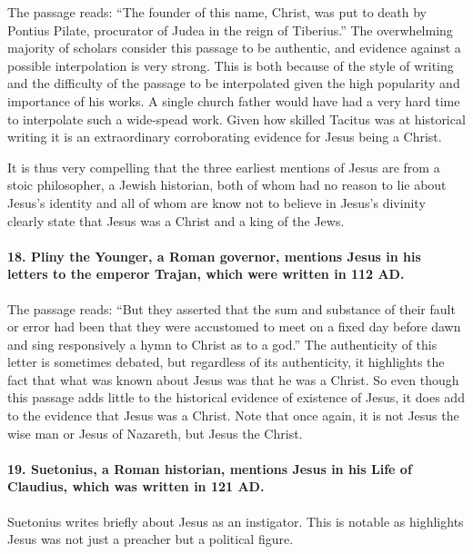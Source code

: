 The passage reads: ``The founder of this name, Christ, was put to death by Pontius Pilate, procurator of Judea in the reign of Tiberius.'' The overwhelming majority of scholars consider this passage to be authentic, and evidence against a possible interpolation is very strong.
This is both because of the style of writing and the difficulty of the passage to be interpolated given the high popularity and importance of his works.
A single church father would have had a very hard time to interpolate such a wide-spead work.
Given how skilled Tacitus was at historical writing it is an extraordinary corroborating evidence for Jesus being a Christ.

It is thus very compelling that the three earliest mentions of Jesus are from a stoic philosopher, a Jewish historian, both of whom had no reason to lie about Jesus's identity and all of whom are know not to believe in Jesus's divinity clearly state that Jesus was a Christ and a king of the Jews.

\paragraph{18.
Pliny the Younger, a Roman governor, mentions Jesus in his letters to the emperor Trajan, which were written in 112 AD.}\label{par:pliny-the-younger-a-roman-governor-mentions-jesus-in-his-letters-to-the-emperor-trajan-which-were-written-in-112-ad.}

The passage reads: ``But they asserted that the sum and substance of their fault or error had been that they were accustomed to meet on a fixed day before dawn and sing responsively a hymn to Christ as to a god.'' The authenticity of this letter is sometimes debated, but regardless of its authenticity, it highlights the fact that what was known about Jesus was that he was a Christ.
So even though this passage adds little to the historical evidence of existence of Jesus, it does add to the evidence that Jesus was a Christ.
Note that once again, it is not Jesus the wise man or Jesus of Nazareth, but Jesus the Christ.

\paragraph{19.
Suetonius, a Roman historian, mentions Jesus in his Life of Claudius, which was written in 121 AD.}\label{par:suetonius-a-roman-historian-mentions-jesus-in-his-life-of-claudius-which-was-written-in-121-ad.}

Suetonius writes briefly about Jesus as an instigator.
This is notable as highlights Jesus was not just a preacher but a political figure.

